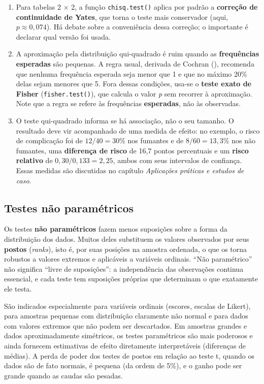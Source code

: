 \documentclass[
]{book}
\providecommand{\tightlist}{%
  \setlength{\itemsep}{0pt}\setlength{\parskip}{0pt}}
\begin{document}
\begin{enumerate}
\def\labelenumi{\arabic{enumi}.}
\tightlist
\item
  Para tabelas 2 × 2, a função \texttt{chisq.test()} aplica por padrão a \textbf{correção de continuidade de Yates}, que torna o teste mais conservador (aqui, \(p \approx 0{,}074\)). Há debate sobre a conveniência dessa correção; o importante é declarar qual versão foi usada.
\item
  A aproximação pela distribuição qui-quadrado é ruim quando as \textbf{frequências esperadas} são pequenas. A regra usual, derivada de Cochran (), recomenda que nenhuma frequência esperada seja menor que 1 e que no máximo 20\% delas sejam menores que 5. Fora dessas condições, usa-se o \textbf{teste exato de Fisher} (\texttt{fisher.test()}), que calcula o valor \emph{p} sem recorrer à aproximação. Note que a regra se refere às frequências \textbf{esperadas}, não às observadas.
\item
  O teste qui-quadrado informa se há associação, não o seu tamanho. O resultado deve vir acompanhado de uma medida de efeito: no exemplo, o risco de complicação foi de \(12/40 = 30\%\) nos fumantes e de \(8/60 = 13{,}3\%\) nos não fumantes, uma \textbf{diferença de risco} de 16,7 pontos percentuais e um \textbf{risco relativo} de \(0{,}30/0{,}133 = 2{,}25\), ambos com seus intervalos de confiança. Essas medidas são discutidas no capítulo \emph{Aplicações práticas e estudos de caso}.
\end{enumerate}

\subsection{Testes não paramétricos}\label{testes-nuxe3o-paramuxe9tricos}

Os testes \textbf{não paramétricos} fazem menos suposições sobre a forma da distribuição dos dados. Muitos deles substituem os valores observados por seus \textbf{postos} (\emph{ranks}), isto é, por suas posições na amostra ordenada, o que os torna robustos a valores extremos e aplicáveis a variáveis ordinais. ``Não paramétrico'' não significa ``livre de suposições'': a independência das observações continua essencial, e cada teste tem suposições próprias que determinam o que exatamente ele testa.

São indicados especialmente para variáveis ordinais (escores, escalas de Likert), para amostras pequenas com distribuição claramente não normal e para dados com valores extremos que não podem ser descartados. Em amostras grandes e dados aproximadamente simétricos, os testes paramétricos são mais poderosos e ainda fornecem estimativas de efeito diretamente interpretáveis (diferenças de médias). A perda de poder dos testes de postos em relação ao teste t, quando os dados são de fato normais, é pequena (da ordem de 5\%), e o ganho pode ser grande quando as caudas são pesadas.
\end{document}
